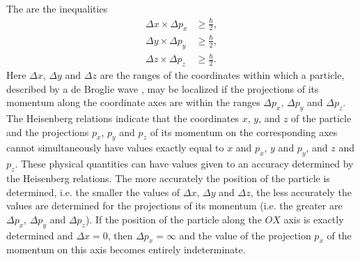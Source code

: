 \subsection{}\label{38.6.2} The  are the inequalities
\begin{align*}%
\Delta x \times \Delta p_{x} & \geqslant \frac{\hbar}{2},\\
\Delta y \times \Delta p_{y} & \geqslant \frac{\hbar}{2},\\
\Delta z \times \Delta p_{z} & \geqslant \frac{\hbar}{2}.
\end{align*}
Here $\Delta x$, $\Delta y$ and $\Delta z$ are the ranges of the coordinates within which a particle, described by a de Broglie wave , may be localized if the projections of its momentum along the coordinate axes are within the ranges $\Delta p_{x}$, $\Delta p_{y}$ and $\Delta p_{z}$. The Heisenberg relations indicate that the coordinates $x$, $y$, and $z$ of the particle and the projections $p_{x}$, $p_{y}$ and $p_{z}$ of its momentum on the corresponding axes cannot simultaneously have values exactly equal to $x$ and $p_{x}$, $y$ and $p_{y}$, and $z$ and $p_{z}$. These physical
quantities can have values given to an accuracy determined by
the Heisenberg relations. The more accurately the position of
the particle is determined, i.e. the smaller the values of $\Delta x$, $\Delta y$ and $\Delta z$, the less accurately the values are determined for the projections of its momentum (i.e. the greater are $\Delta p_{x}$, $\Delta p_{y}$ and $\Delta p_{z}$). If the position of the particle along the $OX$ axis is exactly determined and $\Delta x = 0$, then $\Delta p_{x} = \infty$ and the value of the projection $p_{x}$ of the momentum on this axis becomes entirely indeterminate.

